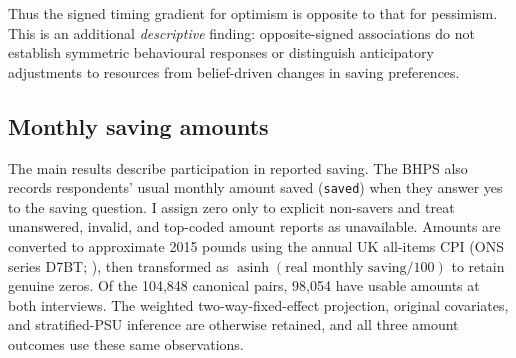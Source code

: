 Thus the signed timing gradient for optimism is opposite to that for pessimism. This is an additional \emph{descriptive} finding: opposite-signed associations do not establish symmetric behavioural responses or distinguish anticipatory adjustments to resources from belief-driven changes in saving preferences.




\subsection{Monthly saving amounts}\label{sec:amounts}

The main results describe participation in reported saving. The BHPS also records respondents' usual monthly amount saved (\texttt{saved}) when they answer yes to the saving question. I assign zero only to explicit non-savers and treat unanswered, invalid, and top-coded amount reports as unavailable. Amounts are converted to approximate 2015 pounds using the annual UK all-items CPI (ONS series D7BT; \citealp{ONSCPI_D7BT}), then transformed as $\operatorname{asinh}(\text{real monthly saving}/100)$ to retain genuine zeros. Of the 104,848 canonical pairs, 98,054 have usable amounts at both interviews. The weighted two-way-fixed-effect projection, original covariates, and stratified-PSU inference are otherwise retained, and all three amount outcomes use these same observations.

